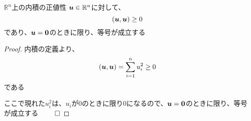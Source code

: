 \documentclass[../../../topic_linear-algebra]{subfiles}
\begin{document}
\br

\begin{theorem*}{$\mathbb{R}^n$上の内積の正値性}
  $\vb*{u} \in \mathbb{R}^n$に対して、
  \begin{equation*}
    (\vb*{u}, \vb*{u}) \geq 0
  \end{equation*}
  であり、$\vb*{u} = \vb*{0}$のときに限り、等号が成立する
\end{theorem*}

\begin{proof}
  内積の定義より、
  \begin{equation*}
    (\vb*{u}, \vb*{u}) = \sum_{i=1}^n u_i^2 \geq 0
  \end{equation*}
  である

  ここで現れた$u_i^2$は、$u_i$が0のときに限り0になるので、$\vb*{u} = \vb*{0}$のときに限り、等号が成立する $\qed$
\end{proof}
\end{document}
